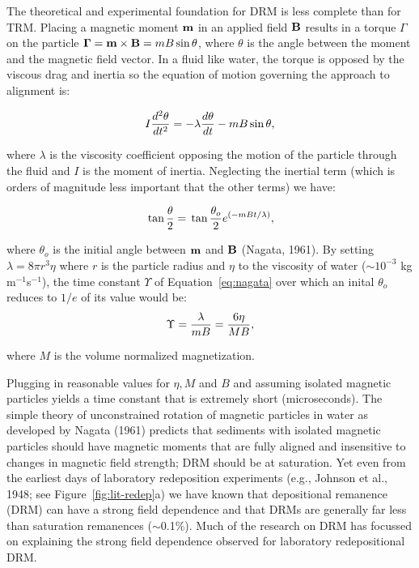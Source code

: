  The theoretical  and experimental  foundation for DRM  is less complete than for TRM.     Placing a magnetic moment $\bf m$  in an applied field  $\bf B$ results in a torque  $\Gamma$ on the particle ${\bf \Gamma} = {\bf m} \times {\bf B} = mB\sin \theta$, where $\theta$ is the angle between the moment and the magnetic field vector.   In a fluid like water, the torque is opposed by the viscous drag and inertia so  the  equation of motion governing the approach to alignment  is: 
  
  \begin{equation}
 I  {{d^2 \theta}\over {dt^2}}  =- \lambda {{d \theta}\over {dt}} - m B \sin \theta, 
 \label{eq:motion}
\end{equation}
 
 \noindent where $\lambda$ is the viscosity coefficient opposing the motion of the particle through the fluid and $I$ is the moment of inertia.  Neglecting the inertial term (which is orders of magnitude less important that the other terms) we have:
 
 \begin{equation}
\tan {\theta \over 2} = \tan {\theta_o \over 2}{e}^{(-m B t/\lambda )},
\label{eq:nagata}
\end{equation}


\noindent where $\theta_o$ is the initial angle between ${\bf m}$ and ${\bf B}$ 
\nocite{nagata61} 
(Nagata, 1961).   By  setting  $\lambda=8\pi  r^3 \eta$ where $r$ is the particle radius and $\eta$ to the viscosity of water ($\sim  10^{-3}$ kg m$^{-1}$s$^{-1}$), the time constant $\Upsilon$ of Equation~\ref{eq:nagata} over which an inital $\theta_o$ reduces to $1/e$ of its value would be:
\begin{equation}
\Upsilon = {{\lambda}\over {mB}} = {  {6 \eta}\over {MB}},
\label{eq:Upsilon}
\end{equation}


\noindent where $M$ is the volume normalized magnetization. 


Plugging in reasonable values for $\eta, M$ and $B$ and assuming isolated magnetic particles yields a  time constant that  is extremely short (microseconds).    
The simple theory of unconstrained rotation of magnetic particles in water as developed by 
\nocite{nagata61}
Nagata (1961) predicts that sediments with isolated magnetic particles should have magnetic moments that are fully aligned and   insensitive to changes in magnetic field strength; DRM should be at saturation.    Yet even from the earliest days of laboratory redeposition experiments  (e.g., 
\nocite{johnson48}
Johnson et al., 1948; see Figure~\ref{fig:lit-redep}a) we have known that  depositional remanence (DRM) can have a strong field dependence and that DRMs are generally far less than saturation remanences  ($\sim$0.1\%).     Much of the research on DRM has focussed on explaining the strong  field dependence observed for laboratory redepositional DRM.    


